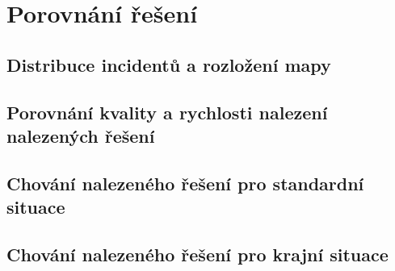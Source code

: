 \chapter{Porovnání řešení}

\section{Distribuce incidentů a rozložení mapy}

\section{Porovnání kvality a rychlosti nalezení nalezených řešení}

\section{Chování nalezeného řešení pro standardní situace}

\section{Chování nalezeného řešení pro krajní situace}


